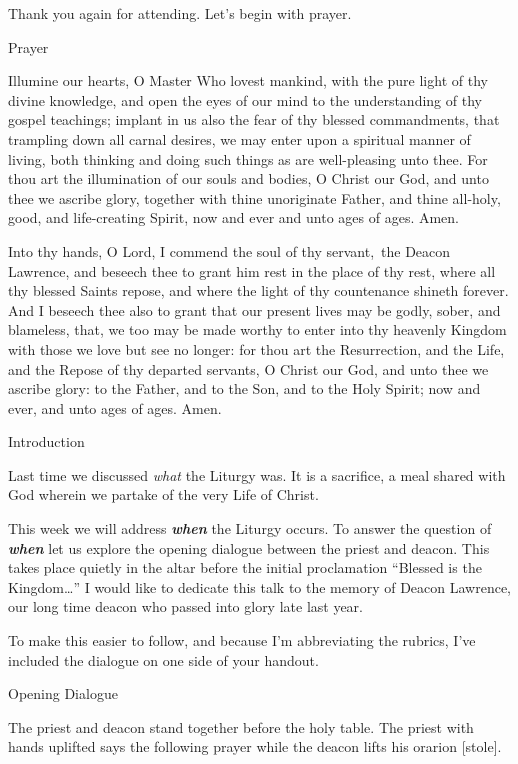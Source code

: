 \documentclass[
]{article}
\begin{document}
Thank you again for attending. Let's begin with prayer.

Prayer

Illumine our hearts, O Master Who lovest mankind, with the pure light of
thy divine knowledge, and open the eyes of our mind to the understanding
of thy gospel teachings; implant in us also the fear of thy blessed
commandments, that trampling down all carnal desires, we may enter upon
a spiritual manner of living, both thinking and doing such things as are
well-pleasing unto thee. For thou art the illumination of our souls and
bodies, O Christ our God, and unto thee we ascribe glory, together with
thine unoriginate Father, and thine all-holy, good, and life-creating
Spirit, now and ever and unto ages of ages. Amen.

Into thy hands, O Lord, I commend the soul of thy servant,~the Deacon
Lawrence, and beseech thee to grant him rest in the place of thy rest,
where all thy blessed Saints repose, and where the light of thy
countenance shineth forever. And I beseech thee also to grant that our
present lives may be godly, sober, and blameless, that, we too may be
made worthy to enter into thy heavenly Kingdom with those we love but
see no longer: for thou art the Resurrection, and the Life, and the
Repose of thy departed servants, O Christ our God, and unto thee we
ascribe glory: to the Father, and to the Son, and to the Holy Spirit;
now and ever, and unto ages of ages. Amen.

Introduction

Last time we discussed \emph{what} the Liturgy was. It is a sacrifice, a
meal shared with God wherein we partake of the very Life of Christ.

This week we will address \textbf{\emph{when}} the Liturgy occurs. To
answer the question of \textbf{\emph{when}} let us explore the opening
dialogue between the priest and deacon. This takes place quietly in the
altar before the initial proclamation ``Blessed is the Kingdom\ldots{}''
I would like to dedicate this talk to the memory of Deacon Lawrence, our
long time deacon who passed into glory late last year.

To make this easier to follow, and because I'm abbreviating the rubrics,
I've included the dialogue on one side of your handout.

Opening Dialogue

The priest and deacon stand together before the holy table. The priest
with hands uplifted says the following prayer while the deacon lifts his
orarion {[}stole{]}.
\end{document}
